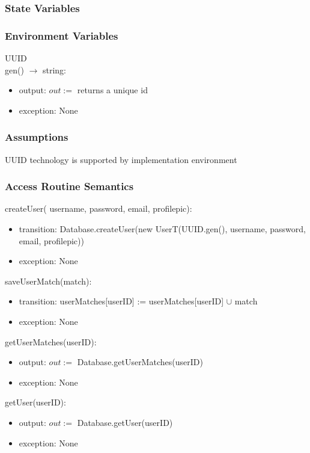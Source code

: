 \documentclass[12pt, titlepage]{article}
\begin{document}
\subsubsection{State Variables}

\subsubsection{Environment Variables}

UUID\\
gen() $\rightarrow$ string:
\begin{itemize}
    \item output: $out := $ returns a unique id
    \item exception:    None
\end{itemize}

\subsubsection{Assumptions}

UUID technology is supported by implementation environment

\subsubsection{Access Routine Semantics}

\noindent createUser( username, password, email, profilepic):
\begin{itemize}
\item transition: Database.createUser(new UserT(UUID.gen(), username, password, email, profilepic))
\item exception: None
\end{itemize}

\noindent saveUserMatch(match):
\begin{itemize}
\item transition: userMatches[userID] :=  userMatches[userID] $\cup$ match 
\item exception: None
\end{itemize}

\noindent getUserMatches(userID): 
\begin{itemize}
\item output: $out := $ Database.getUserMatches(userID)
\item exception: None
\end{itemize}

\noindent getUser(userID):
\begin{itemize}
\item output:  $out := $ Database.getUser(userID)
\item exception: None
\end{itemize}
\end{document}
